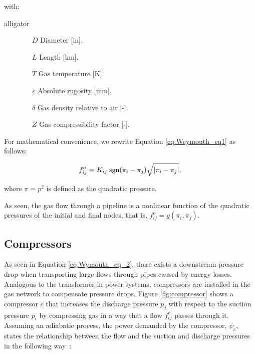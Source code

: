 with:

\begin{labeling}{alligator}
	\item [$\qquad \qquad  D$]  \hspace{0.8cm} Diameter [in].
	\item [$\qquad \qquad  L$]  \hspace{0.8cm} Length [km]. 
	\item [$\qquad \qquad  T$] \hspace{0.8cm} Gas temperature [K].
	\item [$\qquad \qquad  \varepsilon$] \hspace{0.8cm} Absolute rugosity [mm].
	\item [$\qquad \qquad  \delta$] \hspace{0.8cm} Gas density relative to air [-].
	\item [$\qquad \qquad  Z$] \hspace{0.8cm} Gas compressibility factor [-].
\end{labeling}

For mathematical convenience, we rewrite Equation \ref{eq:Weymouth_eq1} as follows:

\begin{equation}
	\label{eq:Wymouth_eq_2}
	f_{ij}^o = K_{ij} \;\text{sgn}(\pi_i - \pi_j)\sqrt{|\pi_i-\pi_j|},
	\vspace{0.3cm}
\end{equation}

\noindent where $\pi=p^2$ is defined as the quadratic pressure. 

As seen, the gas flow through a pipeline is a nonlinear function of the quadratic pressures of the initial and final nodes, that is, $f_{ij}^o=g(\pi_i,\pi_j)$. 

\subsection{Compressors}
\label{subsec:compressors}
As seen in Equation \ref{eq:Wymouth_eq_2}, there exists a downstream pressure drop when transporting large flows through pipes caused by energy losses. Analogous to the transformer in power systems, compressors are installed in the gas network to compensate pressure drops. Figure \ref{fig:compressor} shows a compressor $c$ that increases the discharge pressure $p_j$ with respect to the suction pressure $p_i$ by compressing gas in a way that a flow $f_{ij}^c$ passes through it. Assuming an adiabatic process, the power demanded by the compressor, $\psi_c$, states the relationship between the flow and the suction and discharge pressures in the following way~\cite{Shabanpour2016}:

